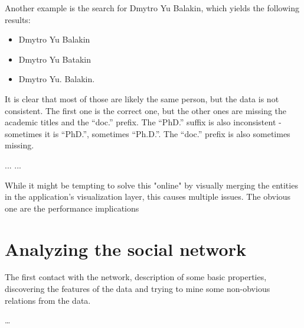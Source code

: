 Another example is the search for Dmytro Yu Balakin, which yields the following results:

\begin{itemize}
    \item Dmytro Yu Balakin
    \item Dmytro Yu Batakin
    \item Dmytro Yu. Balakin.
\end{itemize}

It is clear that most of those are likely the same person, but the data is not consistent. The first one is the correct one, but the other ones are missing the academic titles and the ``doc.'' prefix. The ``PhD.'' suffix is also inconsistent - sometimes it is ``PhD.'', sometimes ``Ph.D.''. The ``doc.'' prefix is also sometimes missing.

...
...

While it might be tempting to solve this "online" by visually merging the entities in the application's visualization layer, this causes multiple issues. The obvious one are the performance implications 

\section{Analyzing the social network}

The first contact with the network, description of some basic properties, discovering the features of the data and trying to mine some non-obvious relations from the data.

\dots